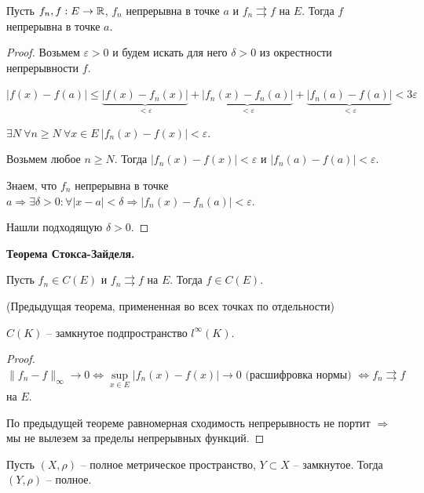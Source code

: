 \begin{theorem}
    Пусть $f_n, f:E\rightarrow \mathbb{R}$, $f_n$ непрерывна в точке $a$ и $f_n\rightrightarrows f$ на $E$. Тогда $f$ непрерывна в точке $a$. 
\end{theorem}

\begin{proof}
    Возьмем $\varepsilon>0$ и будем искать для него $\delta>0$ из окрестности непрерывности $f$.

    $|f(x)-f(a)|\leq \underbrace{|f(x)-f_n(x)|}_{<\varepsilon}+\underbrace{|f_n(x)-f_n(a)|}_{<\varepsilon}+\underbrace{|f_n(a)-f(a)|}_{<\varepsilon}<3\varepsilon$

    $\exists N\ \forall n\geq N\ \forall x\in E\ |f_n(x)-f(x)|<\varepsilon$. 
    
    Возьмем любое $n\geq N$. Тогда $|f_n(x)-f(x)|<\varepsilon$ и $|f_n(a)-f(a)|<\varepsilon$.

    Знаем, что $f_n$ непрерывна в точке $a\Rightarrow \exists \delta>0 : \forall |x-a|<\delta\Rightarrow |f_n(x)-f_n(a)|<\varepsilon$.

    Нашли подходящую $\delta >0$.
\end{proof}

\begin{corollary}
    \textbf{Теорема Стокса-Зайделя.}

    Пусть $f_n\in C(E)$ и $f_n\rightrightarrows f$ на $E$. Тогда $f\in C(E)$.

    (Предыдущая теорема, примененная во всех точках по отдельности)
\end{corollary}

\begin{corollary}
    $C(K)$ – замкнутое подпространство $l^\infty(K)$.
\end{corollary}

\begin{proof}
    $\|f_n - f\|_\infty\rightarrow 0\Leftrightarrow\sup\limits_{x\in E}|f_n(x)-f(x)|\rightarrow 0\text{ (расшифровка нормы) }\Leftrightarrow f_n\rightrightarrows f$ на $E$.

    По предыдущей теореме равномерная сходимость непрерывность не портит $\Rightarrow$ мы не вылезем за пределы непрерывных функций.
\end{proof}

\begin{theorem}
    Пусть $(X, \rho)$ – полное метрическое пространство, $Y\subset X$ – замкнутое. Тогда $(Y, \rho)$ – полное.
\end{theorem}


